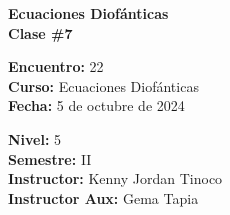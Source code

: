 \begin{center} \textbf
{
    \Large Ecuaciones Diofánticas \\ \vspace{2mm}Clase \#7
}
\end{center}

\begin{multicols}{2}
{
    \textbf{Encuentro:} 22\\
    \textbf{Curso:} Ecuaciones Diofánticas\\
    \textbf{Fecha:} 5 de octubre de 2024\\
    \begin{flushright}
        \textbf{Nivel:} 5\\
        \textbf{Semestre:} II\\
        \textbf{Instructor:} Kenny Jordan Tinoco\\
        \textbf{Instructor Aux:} Gema Tapia
    \end{flushright}
}
\end{multicols}

\thispagestyle{first-page-style}